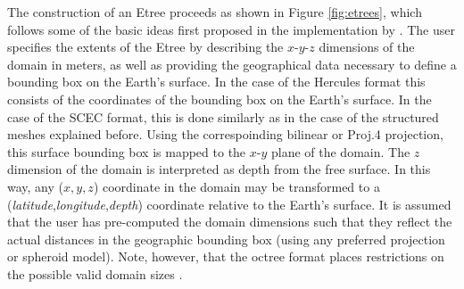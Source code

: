 The construction of an Etree proceeds as shown in Figure \ref{fig:etrees}, which follows some of the basic ideas first proposed in the implementation by \citet{Taborda_2007_Proc}. The user specifies the extents of the Etree by describing the $x$-$y$-$z$ dimensions of the domain in meters, as well as providing the geographical data necessary to define a bounding box on the Earth's surface. In the case of the Hercules format this consists of the coordinates of the bounding box on the Earth's surface. In the case of the SCEC format, this is done similarly as in the case of the structured meshes explained before. Using the correspoinding bilinear or Proj.4 projection, this surface bounding box is mapped to the $x$-$y$ plane of the domain. The $z$ dimension of the domain is interpreted as depth from the free surface. In this way, any ($x,y,z$) coordinate in the domain may be transformed to a (\textit{latitude},\textit{longitude},\textit{depth}) coordinate relative to the Earth's surface. It is assumed that the user has pre-computed the domain dimensions such that they reflect the actual distances in the geographic bounding box (using any preferred projection or spheroid model). Note, however, that the octree format places restrictions on the possible valid domain sizes \citep{Tu_2003_Tech, Taborda_2007_Proc}.




